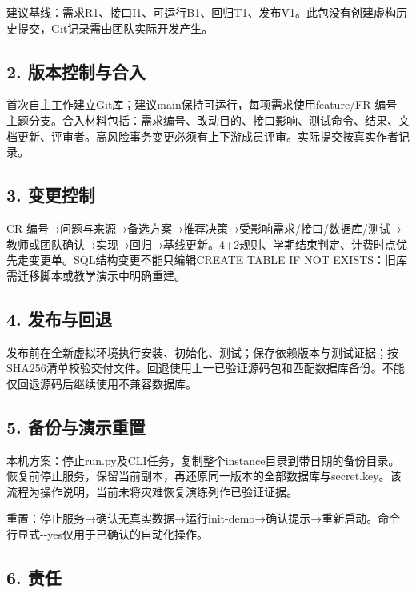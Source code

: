 \documentclass[UTF8,11pt,a4paper]{ctexart}
\begin{document}
建议基线：需求R1、接口I1、可运行B1、回归T1、发布V1。此包没有创建虚构历史提交，Git记录需由团队实际开发产生。

\hypertarget{2-ux7248ux672cux63a7ux5236ux4e0eux5408ux5165}{%
\subsection{2.
版本控制与合入}\label{2-ux7248ux672cux63a7ux5236ux4e0eux5408ux5165}}

首次自主工作建立Git库；建议main保持可运行，每项需求使用feature/FR-编号-主题分支。合入材料包括：需求编号、改动目的、接口影响、测试命令、结果、文档更新、评审者。高风险事务变更必须有上下游成员评审。实际提交按真实作者记录。

\hypertarget{3-ux53d8ux66f4ux63a7ux5236}{%
\subsection{3. 变更控制}\label{3-ux53d8ux66f4ux63a7ux5236}}

CR-编号→问题与来源→备选方案→推荐决策→受影响需求/接口/数据库/测试→教师或团队确认→实现→回归→基线更新。4+2规则、学期结束判定、计费时点优先走变更单。SQL结构变更不能只编辑CREATE
TABLE IF NOT EXISTS：旧库需迁移脚本或教学演示中明确重建。

\hypertarget{4-ux53d1ux5e03ux4e0eux56deux9000}{%
\subsection{4. 发布与回退}\label{4-ux53d1ux5e03ux4e0eux56deux9000}}

发布前在全新虚拟环境执行安装、初始化、测试；保存依赖版本与测试证据；按SHA256清单校验交付文件。回退使用上一已验证源码包和匹配数据库备份。不能仅回退源码后继续使用不兼容数据库。

\hypertarget{5-ux5907ux4efdux4e0eux6f14ux793aux91cdux7f6e}{%
\subsection{5.
备份与演示重置}\label{5-ux5907ux4efdux4e0eux6f14ux793aux91cdux7f6e}}

本机方案：停止run.py及CLI任务，复制整个instance目录到带日期的备份目录。恢复前停止服务，保留当前副本，再还原同一版本的全部数据库与secret.key。该流程为操作说明，当前未将灾难恢复演练列作已验证证据。

重置：停止服务→确认无真实数据→运行init-demo→确认提示→重新启动。命令行显式-\/-yes仅用于已确认的自动化操作。

\hypertarget{6-ux8d23ux4efb}{%
\subsection{6. 责任}\label{6-ux8d23ux4efb}}
\end{document}
